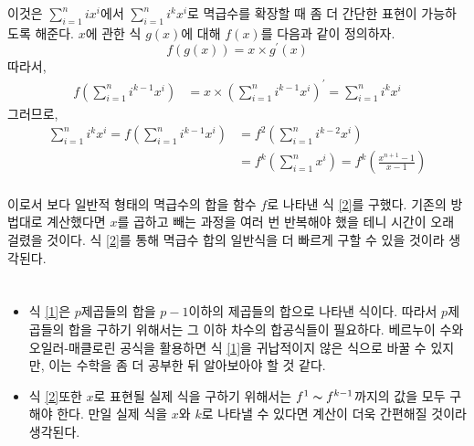 \documentclass[a0,portrait]{a0poster}
\begin{document}
\begin{multicols}{2}
이것은 $\sum_{i=1}^{n}ix^i$에서 $\sum_{i=1}^{n}i^kx^i$로 멱급수를 확장할 때 좀 더 간단한 표현이 가능하도록 해준다. $x$에 관한 식 $g(x)$에 대해 $f(x)$를 다음과 같이 정의하자.
\[f\left(g(x)\right)=x\times g^\prime(x)\]
따라서,
\begin{align*}
f\left(\sum_{i=1}^{n}i^{k-1}x^i\right)&=x\times\left(\sum_{i=1}^{n}i^{k-1}x^i\right)^\prime=\sum_{i=1}^{n}i^kx^i
\end{align*}
그러므로,
\begin{align}
\sum_{i=1}^{n}i^kx^i=f\left(\sum_{i=1}^{n}i^{k-1}x^i\right)&=f^2\left(\sum_{i=1}^{n}i^{k-2}x^i\right) \nonumber \\
&=f^{k}\left(\sum_{i=1}^{n}x^i\right)=f^{k}\left(\frac{x^{n+1}-1}{x-1}\right)
\label{2}
\end{align} \\

이로서 보다 일반적 형태의 멱급수의 합을 함수 $f$로 나타낸 식 \ref{2}를 구했다. 기존의 방법대로 계산했다면 $x$를 곱하고 빼는 과정을 여러 번 반복해야 했을 테니 시간이 오래 걸렸을 것이다. 식 \ref{2}를 통해 멱급수 합의 일반식을 더 빠르게 구할 수 있을 것이라 생각된다.

\color{SaddleBrown} %

\section*{}

\begin{itemize}
\item 식 \ref{1}은 $p$제곱들의 합을  $p-1$이하의 제곱들의 합으로 나타낸 식이다. 따라서 $p$제곱들의 합을 구하기 위해서는 그 이하 차수의 합공식들이 필요하다. 베르누이 수와 오일러-매클로린 공식을 활용하면 식 \ref{1}을 귀납적이지 않은 식으로 바꿀 수 있지만, 이는 수학을 좀 더 공부한 뒤 알아보아야 할 것 같다.
\item 식 \ref{2}또한 $x$로 표현될 실제 식을 구하기 위해서는 $f^1\thicksim f^{k-1}$까지의 값을 모두 구해야 한다. 만일 실제 식을 $x$와 $k$로 나타낼 수 있다면 계산이 더욱 간편해질 것이라 생각된다.
\end{itemize}

\color{DarkSlateGray} %


\end{multicols}
\end{document}
